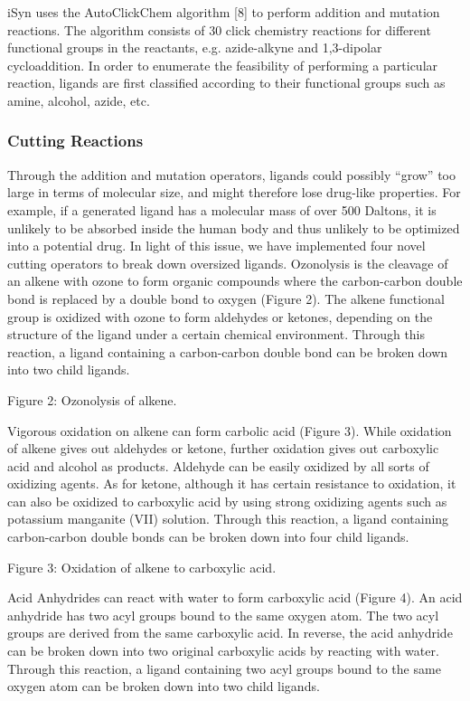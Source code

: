iSyn uses the AutoClickChem algorithm [8] to perform addition and mutation reactions. The algorithm consists of 30 click chemistry reactions for different functional groups in the reactants, e.g. azide-alkyne and 1,3-dipolar cycloaddition. In order to enumerate the feasibility of performing a particular reaction, ligands are first classified according to their functional groups such as amine, alcohol, azide, etc.

\subsubsection{Cutting Reactions}

Through the addition and mutation operators, ligands could possibly “grow” too large in terms of molecular size, and might therefore lose drug-like properties. For example, if a generated ligand has a molecular mass of over 500 Daltons, it is unlikely to be absorbed inside the human body and thus unlikely to be optimized into a potential drug. In light of this issue, we have implemented four novel cutting operators to break down oversized ligands.
Ozonolysis is the cleavage of an alkene with ozone to form organic compounds where the carbon-carbon double bond is replaced by a double bond to oxygen (Figure 2). The alkene functional group is oxidized with ozone to form aldehydes or ketones, depending on the structure of the ligand under a certain chemical environment. Through this reaction, a ligand containing a carbon-carbon double bond can be broken down into two child ligands.
 
Figure 2: Ozonolysis of alkene.

Vigorous oxidation on alkene can form carbolic acid (Figure 3). While oxidation of alkene gives out aldehydes or ketone, further oxidation gives out carboxylic acid and alcohol as products. Aldehyde can be easily oxidized by all sorts of oxidizing agents. As for ketone, although it has certain resistance to oxidation, it can also be oxidized to carboxylic acid by using strong oxidizing agents such as potassium manganite (VII) solution. Through this reaction, a ligand containing carbon-carbon double bonds can be broken down into four child ligands.
 
Figure 3: Oxidation of alkene to carboxylic acid.

Acid Anhydrides can react with water to form carboxylic acid (Figure 4). An acid anhydride has two acyl groups bound to the same oxygen atom. The two acyl groups are derived from the same carboxylic acid. In reverse, the acid anhydride can be broken down into two original carboxylic acids by reacting with water. Through this reaction, a ligand containing two acyl groups bound to the same oxygen atom can be broken down into two child ligands.
 
